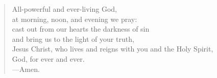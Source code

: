 \prayer

\setlength{\vleftmargin}{\prayerleftmargini}

\begin{verse}
All-powerful and ever-living God,\\
at morning, noon, and evening we pray:\\
cast out from our hearts the darkness of sin\\
and bring us to the light of your truth,\\
Jesus Christ, who lives and reigns with you and the Holy Spirit,\\
God, for ever and ever.\\
{\color{red}---\thinspace}Amen.
\end{verse}

\setlength{\vleftmargin}{\defleftmargini}